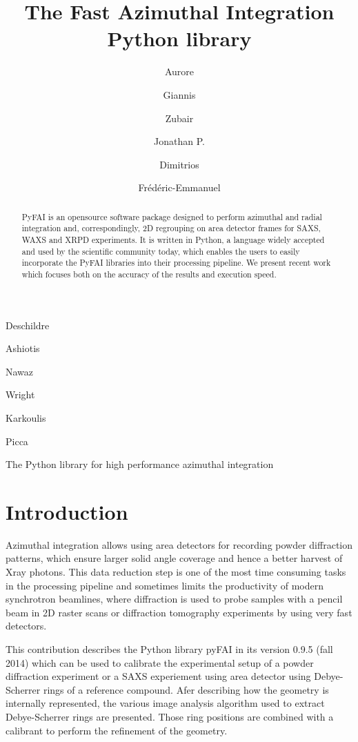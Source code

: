 \documentclass[preprint]{iucr}
\begin{document}
\title{The Fast Azimuthal Integration Python library}

    \author[a]{Aurore}{Deschildre}
    \author[a]{Giannis}{Ashiotis}
    \author[b]{Zubair}{Nawaz}
    \author[a]{Jonathan P.}{Wright}
    \author[a]{Dimitrios}{Karkoulis}
    \author[c]{Fr\'ed\'eric-Emmanuel}{Picca}

\maketitle

\begin{synopsis}
The Python library for high performance azimuthal integration 
\end{synopsis}

\begin{abstract}
PyFAI is an opensource software package designed to perform azimuthal and radial integration and,
correspondingly, 2D regrouping on area detector frames for SAXS, WAXS and XRPD
experiments. It is written in Python, a language widely accepted and used by the scientific community today, which enables
the users to easily incorporate the PyFAI libraries into their processing pipeline. We present recent work
which focuses both on the accuracy of the results and execution speed.
\end{abstract}

\section{Introduction}
Azimuthal integration allows using area detectors for recording powder
diffraction patterns, which  ensure larger solid angle coverage and hence a better harvest of X­ray photons. 
This data reduction 
step is one of the most time ­consuming tasks in the processing pipeline and
sometimes limits the productivity of modern synchrotron beamlines, where
diffraction is used to probe samples with a  pencil beam in 2D raster scans or
diffraction tomography experiments by using very fast detectors. 

This contribution describes the Python library pyFAI in its version 0.9.5 (fall
2014) which can be used to calibrate the experimental setup of a powder
diffraction experiment or a SAXS experiement using area detector using
Debye-Scherrer rings of a reference compound. 
Afer describing how the geometry is internally represented, the various
image analysis algorithm used to extract Debye-Scherrer rings are presented.
Those ring positions are combined with a calibrant to perform the refinement
of the geometry.
\end{document}
